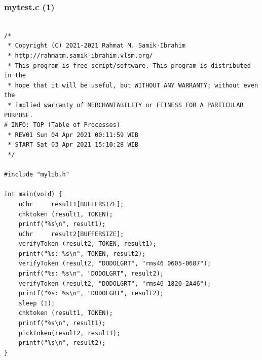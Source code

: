 \documentclass[aspectratio=169, xcolor=table, notheorems, hyperref={pdfpagelabels=false}]{beamer}
\begin{document}
\begin{frame}[fragile]
\frametitle{mytest.c (1)}
\begin{lstlisting}[basicstyle=\ttfamily\tiny]         % 108

/*
 * Copyright (C) 2021-2021 Rahmat M. Samik-Ibrahim
 * http://rahmatm.samik-ibrahim.vlsm.org/
 * This program is free script/software. This program is distributed in the 
 * hope that it will be useful, but WITHOUT ANY WARRANTY; without even the 
 * implied warranty of MERCHANTABILITY or FITNESS FOR A PARTICULAR PURPOSE.
# INFO: TOP (Table of Processes)
 * REV01 Sun 04 Apr 2021 00:11:59 WIB
 * START Sat 03 Apr 2021 15:10:28 WIB
 */

#include "mylib.h"

int main(void) {
    uChr     result1[BUFFERSIZE];
    chktoken (result1, TOKEN);
    printf("%s\n", result1);
    uChr     result2[BUFFERSIZE];
    verifyToken (result2, TOKEN, result1);
    printf("%s: %s\n", TOKEN, result2);
    verifyToken (result2, "DODOLGRT", "rms46 0605-0687");
    printf("%s: %s\n", "DODOLGRT", result2);
    verifyToken (result2, "DODOLGRT", "rms46 1820-2A46");
    printf("%s: %s\n", "DODOLGRT", result2);
    sleep (1);
    chktoken (result1, TOKEN);
    printf("%s\n", result1);
    pickToken(result2, result1);
    printf("%s\n", result2);
}

\end{lstlisting}
\end{frame}
\end{document}
